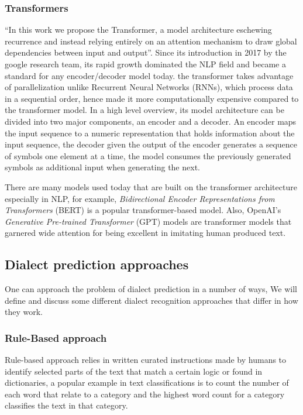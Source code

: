 \documentclass[12pt]{diazessay}
\begin{document}
        \subsubsection{Transformers}
        “In this work we propose the Transformer, a model architecture eschewing recurrence and instead relying entirely on an attention mechanism to draw global dependencies between input and output”\cite{46201}. Since its introduction in 2017 by the google research team, its rapid growth dominated the NLP field and became a standard for any encoder/decoder model today\cite{wolf-etal-2020-transformers}. the transformer takes advantage of parallelization unlike Recurrent Neural Networks (RNNs), which process data in a sequential order, hence made it more computationally expensive compared to the transformer model\cite{46201}. In a high level overview, its model architecture can be divided into two major components, an encoder and a decoder. An encoder maps the input sequence to a numeric representation that holds information about the input sequence, the decoder given the output of the encoder generates a sequence of symbols one element at a time, the model consumes the previously generated symbols as additional input when generating the next\cite{46201}.

        There are many models used today that are built on the transformer architecture especially in NLP, for example, \emph{Bidirectional Encoder Representations from Transformers} (BERT) is a popular transformer-based model. Also, OpenAI's \emph{Generative Pre-trained Transformer} (GPT) models are transformer models that garnered wide attention for being excellent in imitating human produced text.
        

    \subsection{Dialect prediction approaches}
        One can approach the problem of dialect prediction in a number of ways, We will define and discuss some different dialect recognition approaches that differ in how they work.

        
        \subsubsection{Rule-Based approach}
        Rule-based approach relies in written curated instructions made by humans to identify selected parts of the text that match a certain logic or found in dictionaries, a popular example in text classifications is to count the number of each word that relate to a category and the highest word count for a category classifies the text in that category. 
        
\end{document}
